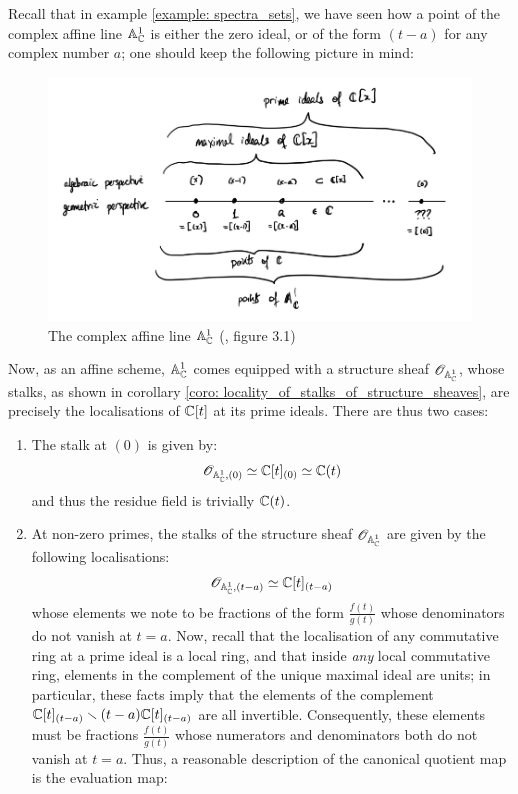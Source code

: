             \begin{example}
                Recall that in example \ref{example: spectra_sets}, we have seen how a point of the complex affine line $\mathbb{A}^1_{\mathbb{C}}$ is either the zero ideal, or of the form $(t - a)$ for any complex number $a$; one should keep the following picture in mind:
                    \begin{figure}[H]
				        \centering
				        \includegraphics[width=\linewidth,height=\textheight,keepaspectratio]{Figures/complex affine line.png}
				        \caption{The complex affine line $\mathbb{A}^1_{\mathbb{C}}$ (\cite{risingsea}, figure 3.1)}
				        \label{fig: complex_affine_line_stalks}
				    \end{figure}
			    \noindent
			    Now, as an affine scheme, $\mathbb{A}^1_{\mathbb{C}}$ comes equipped with a structure sheaf $\mathscr{O}_{\mathbb{A}^1_{\mathbb{C}}}$, whose stalks, as shown in corollary \ref{coro: locality_of_stalks_of_structure_sheaves}, are precisely the localisations of $\mathbb{C}[t]$ at its prime ideals. There are thus two cases:
			        \begin{enumerate}
			            \item The stalk at $(0)$ is given by:
			                $$\mathscr{O}_{\mathbb{A}^1_{\mathbb{C}}, (0)} \simeq \mathbb{C}[t]_{(0)} \simeq \mathbb{C}(t)$$
		                and thus the residue field is trivially $\mathbb{C}(t)$.
			            \item At non-zero primes, the stalks of the structure sheaf $\mathscr{O}_{\mathbb{A}^1_{\mathbb{C}}}$ are given by the following localisations:
			                $$\mathscr{O}_{\mathbb{A}^1_{\mathbb{C}}, (t - a)} \simeq \mathbb{C}[t]_{(t - a)}$$
		                whose elements we note to be fractions of the form $\frac{f(t)}{g(t)}$ whose denominators do not vanish at $t = a$. Now, recall that the localisation of any commutative ring at a prime ideal is a local ring, and that inside \textit{any} local commutative ring, elements in the complement of the unique maximal ideal are units; in particular, these facts imply that the elements of the complement $\mathbb{C}[t]_{(t - a)} \smallsetminus (t - a)\mathbb{C}[t]_{(t - a)}$ are all invertible. Consequently, these elements must be fractions $\frac{f(t)}{g(t)}$ whose numerators and denominators both do not vanish at $t = a$. Thus, a reasonable description of the canonical quotient map is the evaluation map:

\end{enumerate}
\end{example}

